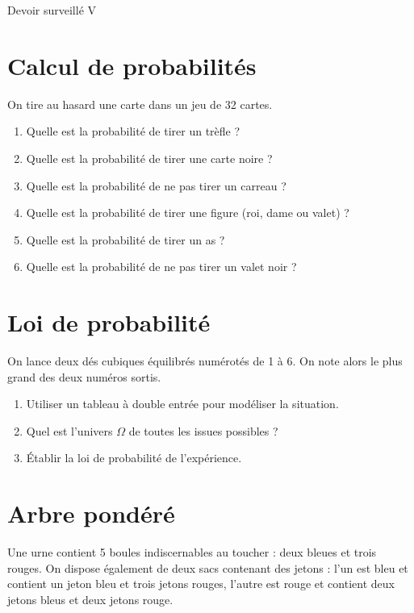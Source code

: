 \documentclass[french]{book}
\begin{document}
\begin{center}
\huge{ Devoir surveillé V}
\end{center}

\section*{Calcul de probabilités}
   On tire au hasard une carte dans un jeu de 32 cartes.
   \begin{enumerate}
      \item Quelle est la probabilité de tirer un trèfle ?
      \item Quelle est la probabilité de tirer une carte noire     ?
      \item Quelle est la probabilité de ne pas tirer un carreau ?
      \item Quelle est la probabilité de tirer une figure (roi, dame ou valet) ?
      \item Quelle est la probabilité de tirer un as ?
      \item Quelle est la probabilité de ne pas tirer un valet noir ? \\
   \end{enumerate}

\section*{Loi de probabilité}
On lance deux dés cubiques équilibrés numérotés de 1 à 6.    On note alors le plus grand des deux numéros sortis.
   \begin{enumerate}
      \item Utiliser un tableau à double entrée pour modéliser la situation.
      \item Quel est l'univers $\Omega$ de toutes les issues possibles ?
      \item Établir la loi de probabilité de l'expérience.
   \end{enumerate}

\section*{Arbre pondéré}

Une urne contient 5 boules indiscernables au toucher : deux bleues et trois rouges.
On dispose également de deux sacs contenant des jetons : l'un est bleu et contient un jeton 
bleu et trois jetons rouges, l’autre est rouge et contient deux jetons bleus et deux jetons rouge. \\
\end{document}
